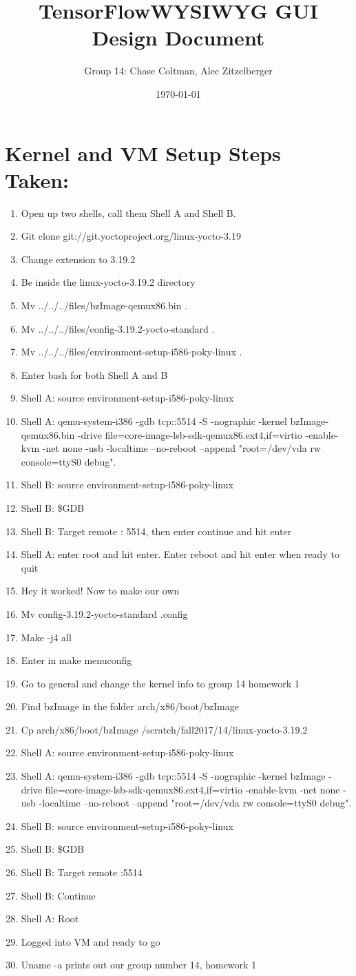 \documentclass[journal,10pt,onecolumn,compsoc]{IEEEtran} \usepackage[margin=1.0in]{geometry} \usepackage{pdfpages}
\title{TensorFlow\texttrademark WYSIWYG GUI Design Document}
\author{Group 14: Chase Coltman, Alec Zitzelberger}
\date{\today}
\begin{document}
\section{Kernel and VM Setup Steps Taken:}
	\begin{enumerate}
	\item Open up two shells, call them Shell A and Shell B.
	\item Git clone git://git.yoctoproject.org/linux-yocto-3.19
	\item Change extension to 3.19.2
	\item Be inside the linux-yocto-3.19.2 directory
	\item Mv ../../../files/bzImage-qemux86.bin .
	\item Mv ../../../files/config-3.19.2-yocto-standard .
	\item Mv ../../../files/environment-setup-i586-poky-linux .
	\item Enter bash for both Shell A and B
	\item Shell A: source environment-setup-i586-poky-linux
	\item Shell A: qemu-system-i386 -gdb tcp::5514 -S -nographic -kernel bzImage-qemux86.bin -drive file=core-image-lsb-sdk-qemux86.ext4,if=virtio -enable-kvm -net none -usb -localtime --no-reboot --append "root=/dev/vda rw console=ttyS0 debug".
	\item Shell B: source environment-setup-i586-poky-linux
	\item Shell B: \$GDB
	\item Shell B: Target remote : 5514, then enter continue and hit enter
	\item Shell A: enter root and hit enter. Enter reboot and hit enter when ready to quit
	\item Hey it worked! Now to make our own
	\item Mv config-3.19.2-yocto-standard .config
	\item Make -j4 all
	\item Enter in make menuconfig
	\item Go to general and change the kernel info to group 14 homework 1
	\item Find bzImage in the folder arch/x86/boot/bzImage
	\item Cp arch/x86/boot/bzImage /scratch/fall2017/14/linux-yocto-3.19.2
	\item Shell A: source environment-setup-i586-poky-linux
	\item Shell A: qemu-system-i386 -gdb tcp::5514 -S -nographic -kernel bzImage -drive file=core-image-lsb-sdk-qemux86.ext4,if=virtio -enable-kvm -net none -usb -localtime --no-reboot --append "root=/dev/vda rw console=ttyS0 debug".
	\item Shell B: source environment-setup-i586-poky-linux
	\item Shell B: \$GDB
	\item Shell B: Target remote :5514
	\item Shell B: Continue
	\item Shell A: Root
	\item Logged into VM and ready to go
	\item Uname -a prints out our group number 14, homework 1
\end{enumerate}
\end{document}

